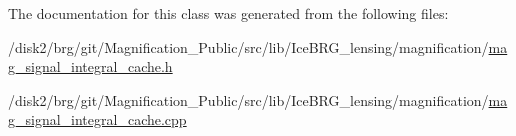 The documentation for this class was generated from the following files\-:\begin{DoxyCompactItemize}
\item 
/disk2/brg/git/\-Magnification\-\_\-\-Public/src/lib/\-Ice\-B\-R\-G\-\_\-lensing/magnification/\hyperlink{mag__signal__integral__cache_8h}{mag\-\_\-signal\-\_\-integral\-\_\-cache.\-h}\item 
/disk2/brg/git/\-Magnification\-\_\-\-Public/src/lib/\-Ice\-B\-R\-G\-\_\-lensing/magnification/\hyperlink{mag__signal__integral__cache_8cpp}{mag\-\_\-signal\-\_\-integral\-\_\-cache.\-cpp}\end{DoxyCompactItemize}
